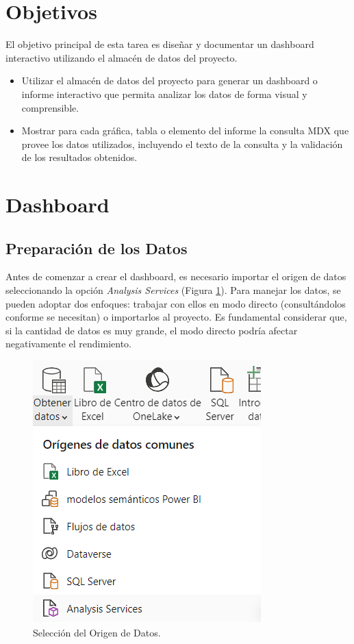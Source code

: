 \documentclass{article}
\begin{document}
\section{Objetivos}


El objetivo principal de esta tarea es diseñar y documentar un dashboard interactivo utilizando el almacén de datos del proyecto.

\begin{itemize}
	\item Utilizar el almacén de datos del proyecto para generar un dashboard o informe interactivo que permita analizar los datos de forma visual y comprensible.

	\item Mostrar para cada gráfica, tabla o elemento del informe la consulta MDX que provee los datos utilizados, incluyendo el texto de la consulta y la validación de los resultados obtenidos.
	
\end{itemize}


\section{Dashboard}

\subsection{Preparación de los Datos}
Antes de comenzar a crear el dashboard, es necesario importar el origen de datos seleccionando la opción \textit{Analysis Services} (Figura \ref{fig:origen}). Para manejar los datos, se pueden adoptar dos enfoques: trabajar con ellos en modo directo (consultándolos conforme se necesitan) o importarlos al proyecto. Es fundamental considerar que, si la cantidad de datos es muy grande, el modo directo podría afectar negativamente el rendimiento.

\begin{figure}[H]
	\centering
	\includegraphics[width=.3\textwidth]{images/origen_datos.png}
	\caption{Selección del Origen de Datos.}
	\label{fig:origen}
\end{figure}
\end{document}
